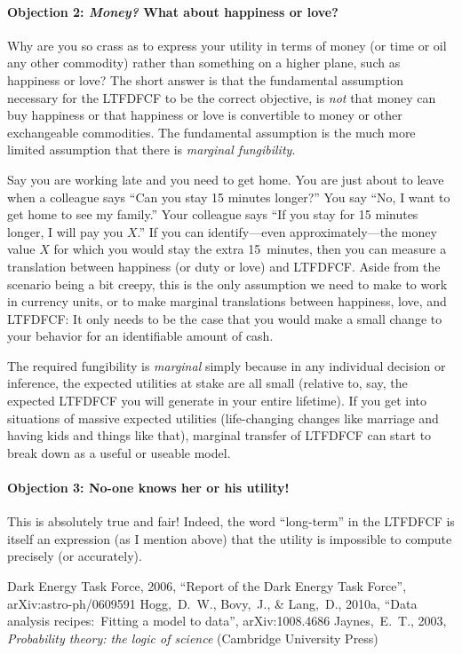 \documentclass[12pt,twoside,pdftex]{article}
\begin{document}
\paragraph{Objection 2: \emph{Money?} What about happiness or love?}
Why are you so crass as to express your utility in terms of money (or
time or oil any other commodity) rather than something on a higher
plane, such as happiness or love?  The short answer is that the
fundamental assumption necessary for the LTFDFCF to be the correct
objective, is \emph{not} that money can buy happiness or that
happiness or love is convertible to money or other exchangeable
commodities.  The fundamental assumption is the much more limited
assumption that there is \emph{marginal fungibility}.

Say you are working late and you need to get home.  You are just about
to leave when a colleague says ``Can you stay 15 minutes longer?''
You say ``No, I want to get home to see my family.''  Your colleague
says ``If you stay for 15 minutes longer, I will pay you $X$.''  If
you can identify---even approximately---the money value $X$ for which
you would stay the extra 15~minutes, then you can measure a
translation between happiness (or duty or love) and LTFDFCF.  Aside
from the scenario being a bit creepy, this is the only assumption we
need to make to work in currency units, or to make marginal
translations between happiness, love, and LTFDFCF: It only needs to be
the case that you would make a small change to your behavior for an
identifiable amount of cash.

The required fungibility is \emph{marginal} simply because in any
individual decision or inference, the expected utilities at stake are
all small (relative to, say, the expected LTFDFCF you will generate in
your entire lifetime).  If you get into situations of massive expected
utilities (life-changing changes like marriage and having kids and
things like that), marginal transfer of LTFDFCF can start to break
down as a useful or useable model.

\paragraph{Objection 3: No-one knows her or his utility!}
This is absolutely true and fair!  Indeed, the word ``long-term'' in
the LTFDFCF is itself an expression (as I mention above) that the
utility is impossible to compute precisely (or accurately).

\clearpage
{}\theendnotes

\clearpage
\begin{thebibliography}{}\raggedright
{}
  Dark Energy Task Force, 2006,
  ``Report of the Dark Energy Task Force'', arXiv:astro-ph/0609591
  Hogg,~D.~W., Bovy,~J., \& Lang,~D., 2010a,
  ``Data analysis recipes:\ Fitting a model to data'', arXiv:1008.4686
  Jaynes,~E.~T., 2003,
  \textit{Probability theory: the logic of science} (Cambridge University Press)
\end{thebibliography}
\end{document}
